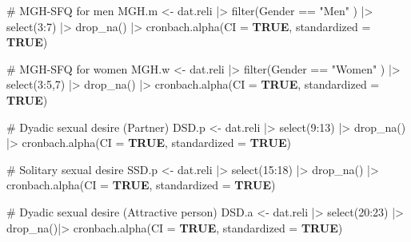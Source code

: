 \documentclass[
  bookmarksnumbered]{article}
\newenvironment{Shaded}{\begin{snugshade}}{\end{snugshade}}
\newcommand{\AttributeTok}[1]{\textcolor[rgb]{0.80,0.80,0.80}{#1}}
\newcommand{\CommentTok}[1]{\textcolor[rgb]{0.50,0.62,0.50}{#1}}
\newcommand{\ConstantTok}[1]{\textcolor[rgb]{0.86,0.64,0.64}{\textbf{#1}}}
\newcommand{\DecValTok}[1]{\textcolor[rgb]{0.86,0.86,0.80}{#1}}
\newcommand{\FunctionTok}[1]{\textcolor[rgb]{0.94,0.94,0.56}{#1}}
\newcommand{\NormalTok}[1]{\textcolor[rgb]{0.80,0.80,0.80}{#1}}
\newcommand{\OtherTok}[1]{\textcolor[rgb]{0.94,0.94,0.56}{#1}}
\newcommand{\SpecialCharTok}[1]{\textcolor[rgb]{0.86,0.64,0.64}{#1}}
\newcommand{\StringTok}[1]{\textcolor[rgb]{0.80,0.58,0.58}{#1}}
\begin{document}
\begin{Shaded}
\begin{Highlighting}[]
\CommentTok{\# MGH{-}SFQ for men}
\NormalTok{MGH.m }\OtherTok{\textless{}{-}}\NormalTok{ dat.reli }\SpecialCharTok{|\textgreater{}}
  \FunctionTok{filter}\NormalTok{(Gender }\SpecialCharTok{==} \StringTok{"Men"}\NormalTok{ ) }\SpecialCharTok{|\textgreater{}} 
  \FunctionTok{select}\NormalTok{(}\DecValTok{3}\SpecialCharTok{:}\DecValTok{7}\NormalTok{) }\SpecialCharTok{|\textgreater{}} 
  \FunctionTok{drop\_na}\NormalTok{() }\SpecialCharTok{|\textgreater{}}  
  \FunctionTok{cronbach.alpha}\NormalTok{(}\AttributeTok{CI =} \ConstantTok{TRUE}\NormalTok{, }\AttributeTok{standardized =} \ConstantTok{TRUE}\NormalTok{)}

\CommentTok{\# MGH{-}SFQ for women}
\NormalTok{MGH.w }\OtherTok{\textless{}{-}}\NormalTok{ dat.reli }\SpecialCharTok{|\textgreater{}}
  \FunctionTok{filter}\NormalTok{(Gender }\SpecialCharTok{==} \StringTok{"Women"}\NormalTok{ ) }\SpecialCharTok{|\textgreater{}} 
  \FunctionTok{select}\NormalTok{(}\DecValTok{3}\SpecialCharTok{:}\DecValTok{5}\NormalTok{,}\DecValTok{7}\NormalTok{) }\SpecialCharTok{|\textgreater{}} 
  \FunctionTok{drop\_na}\NormalTok{() }\SpecialCharTok{|\textgreater{}} 
  \FunctionTok{cronbach.alpha}\NormalTok{(}\AttributeTok{CI =} \ConstantTok{TRUE}\NormalTok{, }\AttributeTok{standardized =} \ConstantTok{TRUE}\NormalTok{)}

\CommentTok{\# Dyadic sexual desire (Partner)}
\NormalTok{DSD.p }\OtherTok{\textless{}{-}}\NormalTok{ dat.reli }\SpecialCharTok{|\textgreater{}}
  \FunctionTok{select}\NormalTok{(}\DecValTok{9}\SpecialCharTok{:}\DecValTok{13}\NormalTok{) }\SpecialCharTok{|\textgreater{}} 
  \FunctionTok{drop\_na}\NormalTok{() }\SpecialCharTok{|\textgreater{}} 
  \FunctionTok{cronbach.alpha}\NormalTok{(}\AttributeTok{CI =} \ConstantTok{TRUE}\NormalTok{, }\AttributeTok{standardized =} \ConstantTok{TRUE}\NormalTok{)}

\CommentTok{\# Solitary sexual desire}
\NormalTok{SSD.p }\OtherTok{\textless{}{-}}\NormalTok{ dat.reli }\SpecialCharTok{|\textgreater{}}
  \FunctionTok{select}\NormalTok{(}\DecValTok{15}\SpecialCharTok{:}\DecValTok{18}\NormalTok{) }\SpecialCharTok{|\textgreater{}} 
  \FunctionTok{drop\_na}\NormalTok{() }\SpecialCharTok{|\textgreater{}} 
  \FunctionTok{cronbach.alpha}\NormalTok{(}\AttributeTok{CI =} \ConstantTok{TRUE}\NormalTok{, }\AttributeTok{standardized =} \ConstantTok{TRUE}\NormalTok{)}

\CommentTok{\# Dyadic sexual desire (Attractive person)}
\NormalTok{DSD.a }\OtherTok{\textless{}{-}}\NormalTok{ dat.reli }\SpecialCharTok{|\textgreater{}}
  \FunctionTok{select}\NormalTok{(}\DecValTok{20}\SpecialCharTok{:}\DecValTok{23}\NormalTok{) }\SpecialCharTok{|\textgreater{}} 
  \FunctionTok{drop\_na}\NormalTok{()}\SpecialCharTok{|\textgreater{}} 
  \FunctionTok{cronbach.alpha}\NormalTok{(}\AttributeTok{CI =} \ConstantTok{TRUE}\NormalTok{, }\AttributeTok{standardized =} \ConstantTok{TRUE}\NormalTok{)}


\end{Highlighting}
\end{Shaded}
\end{document}
